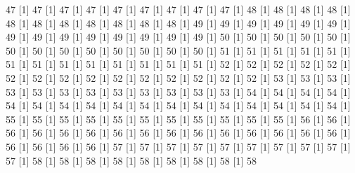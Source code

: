 \documentclass[12pt]{article}
\begin{document}
\begin{Schunk}
\begin{Soutput}
[1] 47%
[1] 47%
[1] 47%
[1] 47%
[1] 47%
[1] 47%
[1] 47%
[1] 47%
[1] 47%
[1] 48%
[1] 48%
[1] 48%
[1] 48%
[1] 48%
[1] 48%
[1] 48%
[1] 48%
[1] 48%
[1] 48%
[1] 48%
[1] 49%
[1] 49%
[1] 49%
[1] 49%
[1] 49%
[1] 49%
[1] 49%
[1] 49%
[1] 49%
[1] 49%
[1] 49%
[1] 49%
[1] 49%
[1] 49%
[1] 50%
[1] 50%
[1] 50%
[1] 50%
[1] 50%
[1] 50%
[1] 50%
[1] 50%
[1] 50%
[1] 50%
[1] 50%
[1] 50%
[1] 50%
[1] 51%
[1] 51%
[1] 51%
[1] 51%
[1] 51%
[1] 51%
[1] 51%
[1] 51%
[1] 51%
[1] 51%
[1] 51%
[1] 51%
[1] 51%
[1] 52%
[1] 52%
[1] 52%
[1] 52%
[1] 52%
[1] 52%
[1] 52%
[1] 52%
[1] 52%
[1] 52%
[1] 52%
[1] 52%
[1] 52%
[1] 52%
[1] 52%
[1] 53%
[1] 53%
[1] 53%
[1] 53%
[1] 53%
[1] 53%
[1] 53%
[1] 53%
[1] 53%
[1] 53%
[1] 53%
[1] 53%
[1] 54%
[1] 54%
[1] 54%
[1] 54%
[1] 54%
[1] 54%
[1] 54%
[1] 54%
[1] 54%
[1] 54%
[1] 54%
[1] 54%
[1] 54%
[1] 54%
[1] 54%
[1] 54%
[1] 54%
[1] 55%
[1] 55%
[1] 55%
[1] 55%
[1] 55%
[1] 55%
[1] 55%
[1] 55%
[1] 55%
[1] 55%
[1] 55%
[1] 56%
[1] 56%
[1] 56%
[1] 56%
[1] 56%
[1] 56%
[1] 56%
[1] 56%
[1] 56%
[1] 56%
[1] 56%
[1] 56%
[1] 56%
[1] 56%
[1] 56%
[1] 56%
[1] 56%
[1] 56%
[1] 56%
[1] 57%
[1] 57%
[1] 57%
[1] 57%
[1] 57%
[1] 57%
[1] 57%
[1] 57%
[1] 57%
[1] 57%
[1] 58%
[1] 58%
[1] 58%
[1] 58%
[1] 58%
[1] 58%
[1] 58%
[1] 58%
[1] 58%

\end{Soutput}
\end{Schunk}
\end{document}
